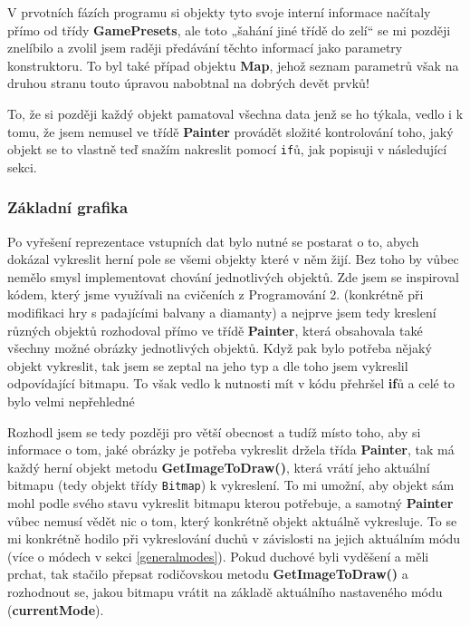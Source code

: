 \documentclass[a4]{article}
\begin{document}
V prvotních fázích programu si objekty tyto svoje interní informace načítaly přímo od třídy \textbf{GamePresets}, ale toto „šahání jiné třídě do zelí“ se mi později znelíbilo a zvolil jsem raději předávání těchto informací jako parametry konstruktoru. To byl také případ objektu \textbf{Map}, jehož seznam parametrů však na druhou stranu touto úpravou nabobtnal na dobrých devět prvků!

To, že si později každý objekt pamatoval všechna data jenž se ho týkala, vedlo i k tomu, že jsem nemusel ve třídě \textbf{Painter} provádět složité kontrolování toho, jaký objekt se to vlastně teď snažím nakreslit pomocí \verb|if|ů, jak popisuji v následující sekci.

\subsubsection{Základní grafika} \label{staticgraphics}
Po vyřešení reprezentace vstupních dat bylo nutné se postarat o to, abych dokázal vykreslit herní pole se všemi objekty které v něm žijí. Bez toho by vůbec nemělo smysl implementovat chování jednotlivých objektů. Zde jsem se inspiroval kódem, který jsme využívali na cvičeních z Programování 2. (konkrétně při modifikaci hry s padajícími balvany a diamanty) a nejprve jsem tedy kreslení různých objektů rozhodoval přímo ve třídě \textbf{Painter}, která obsahovala také všechny možné obrázky jednotlivých objektů. Když pak bylo potřeba nějaký objekt vykreslit, tak jsem se zeptal na jeho typ a dle toho jsem vykreslil odpovídající bitmapu. To však vedlo k nutnosti mít v kódu přehršel \textbf{if}ů a celé to bylo velmi nepřehledné

Rozhodl jsem se tedy později pro větší obecnost a tudíž místo toho, aby si informace o tom, jaké obrázky je potřeba vykreslit držela třída \textbf{Painter}, tak má každý herní objekt metodu \textbf{GetImageToDraw()}, která vrátí jeho aktuální bitmapu (tedy objekt třídy \verb|Bitmap|) k vykreslení. To mi umožní, aby objekt sám mohl podle svého stavu vykreslit bitmapu kterou potřebuje, a samotný \textbf{Painter} vůbec nemusí vědět nic o tom, který konkrétně objekt aktuálně vykresluje. To se mi konkrétně hodilo při vykreslování duchů v závislosti na jejich aktuálním módu (více o módech v sekci \ref{generalmodes}). Pokud duchové byli vyděšení a měli prchat, tak stačilo přepsat rodičovskou metodu \textbf{GetImageToDraw()} a rozhodnout se, jakou bitmapu vrátit na základě aktuálního nastaveného módu (\textbf{currentMode}).
\end{document}
